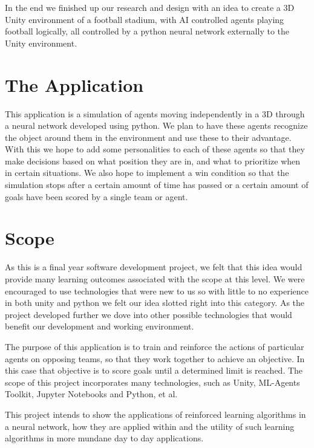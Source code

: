 In the end we finished up our research and design with an idea to create a 3D Unity environment of a football stadium, with AI controlled agents playing football logically, all controlled by a python neural network externally to the Unity environment.


\section{The Application}
This application is a simulation of agents moving independently in a 3D through a neural network developed using python. We plan to have these agents recognize the object around them in the environment and use these to their advantage. With this we hope to add some personalities to each of these agents so that they make decisions based on what position they are in, and what to prioritize when in certain situations. We also hope to implement a win condition so that the simulation stops after a certain amount of time has passed or a certain amount of goals have been scored by a single team or agent.

\section{Scope}
As this is a final year software development project, we felt that this idea would provide many learning outcomes associated with the scope at this level. We were encouraged to use technologies that were new to us so with little to no experience in both unity and python we felt our idea slotted right into this category. As the project developed further we dove into other possible technologies that would benefit our development and working environment.

The purpose of this application is to train and reinforce the actions of particular agents on opposing teams, so that they work together to achieve an objective. In this case that objective is to score goals until a determined limit is reached. The scope of this project incorporates many technologies, such as Unity, ML-Agents Toolkit, Jupyter Notebooks and Python, et al. 

This project intends to show the applications of reinforced learning algorithms in a neural network, how they are applied within and the utility of such learning algorithms in more mundane day to day applications.




